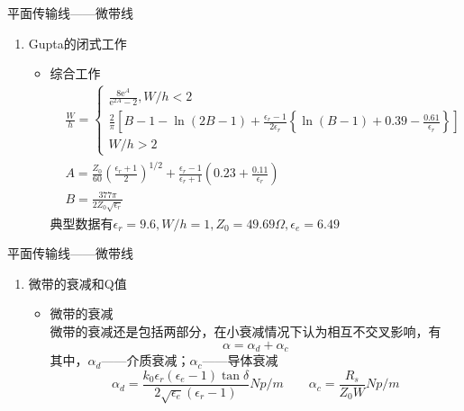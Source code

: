 \begin{frame}{平面传输线——微带线}
    \begin{enumerate}
        \resume
        \item Gupta的闭式工作\\
        \begin{itemize}
            \item 综合工作
            \begin{align*}
                &\frac{W}{h}=
                \begin{cases}
                    \frac{8\mathrm{e}^{A}}{\mathrm{e}^{2A}-2},  W/h<2\\
                    \frac{2}{\pi}\left[B-1-\ln(2B-1)+
                    \frac{\epsilon_r-1}{2\epsilon_r}\left\{\ln(B-1)+0.39-\frac{0.61}{\epsilon_r}\right\}\right] \\
                    W/h>2
                \end{cases}\\
                &A=\frac{Z_0}{60}\left(\frac{\epsilon_r+1}{2}\right)^{1/2}+\frac{\epsilon_r-1}{\epsilon_r+1}\left(0.23+\frac{0.11}{\epsilon_r}\right)\\
                &B=\frac{377\pi}{2Z_0\sqrt{\epsilon_r}}
            \end{align*}
            典型数据有$\epsilon_r=9.6,W/h=1,Z_0=49.69\Omega,\epsilon_e=6.49$
        \end{itemize}
        \saveenum
    \end{enumerate}
\end{frame}

\begin{frame}{平面传输线——微带线}
    \begin{enumerate}
        \resume
        \item 微带的衰减和Q值
        \begin{itemize}
            \item 微带的衰减\\
            微带的衰减还是包括两部分，在小衰减情况下认为相互不交叉影响，有
            $$\alpha=\alpha_d+\alpha_c$$
            其中，$\alpha_d$——介质衰减；$\alpha_c$——导体衰减
            $$\alpha_d=\frac{k_0\epsilon_r(\epsilon_e-1)\tan\delta}{2\sqrt{\epsilon_e}(\epsilon_r-1)}Np/m\qquad \alpha_c=\frac{R_s}{Z_0W}Np/m$$
        \end{itemize}
    \end{enumerate}
\end{frame}

